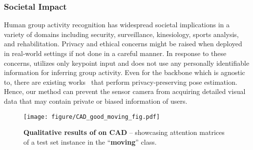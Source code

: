 \documentclass[runningheads]{llncs}
\begin{document}
 
 \subsubsection{Societal Impact} 
Human group activity recognition has widespread societal implications in a variety of domains including security, surveillance, kinesiology, sports analysis, and rehabilitation. Privacy and ethical concerns might be raised when deployed in real-world settings
if not done in a careful manner.
In response to these concerns, \ours
utilizes only keypoint input and does not use any personally identifiable information for inferring group activity. 
Even for the backbone which \ours is agnostic to, there are existing works~\cite{hinojosa2021learning} that perform privacy-preserving pose estimation.
Hence, our method can prevent the sensor camera from acquiring detailed visual data that may contain private or biased information of users. 






 




 





\clearpage
\begin{figure*}[t]
	\centering
	\texttt{[image: figure/CAD\_good\_moving\_fig.pdf]} 
	\caption{\textbf{Qualitative results of \ours on CAD} -- showcasing attention matrices of a test set instance in the ``\textbf{moving}'' class.  
}
	\label{fig:CAD_good_moving} 
\end{figure*}
 
\end{document}
